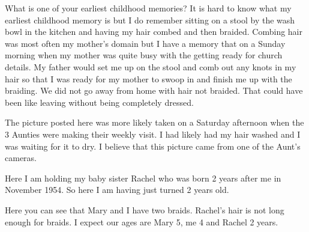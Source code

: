 What is one of your earliest childhood memories?
It is hard to know what my earliest childhood memory is but I do remember sitting on a stool by the wash bowl in the kitchen and having my hair combed and then braided.
Combing hair was most often my mother's domain but I have a memory that on a Sunday morning when my mother was quite busy with the getting ready for church details.
My father would set me up on the stool and comb out any knots in my hair so that I was ready for my mother to swoop in and finish me up with the braiding.
We did not go away from home with hair not braided.
That could have been like leaving without being completely dressed.

The picture posted here was more likely taken on a Saturday afternoon when the 3 Aunties were making their weekly visit.
I had likely had my hair washed and I was waiting for it to dry.
I believe that this picture came from one of the Aunt's cameras.

Here I am holding my baby sister Rachel who was born 2 years after me in November 1954.
So here I am having just turned 2 years old.

Here you can see that Mary and I have two braids.
Rachel's hair is not long enough for braids.
I expect our ages are Mary 5, me 4 and Rachel 2 years.
